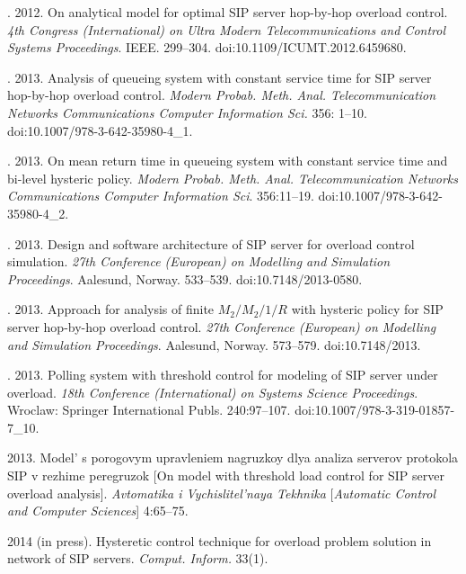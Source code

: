 \begin{multicols}{2}
{{\begin{thebibliography}{99}
. 2012.
On analytical model for optimal SIP server hop-by-hop
overload control. \textit{4th  Congress (International) on
Ultra Modern Telecommunications and Control Systems
Proceedings}. IEEE. 299--304.
doi:10.1109/ICUMT.2012.6459680.

. 2013.
Analysis of queueing system with constant service
time for SIP server hop-by-hop overload control.
\textit{Modern Probab. Meth. Anal.
Telecommunication Networks Communications
Computer Information Sci.} 356: 1--10. doi:10.1007/978-3-642-35980-4\_1.

. 2013.
On mean return time in queueing system with
constant service time and bi-level hysteric policy.
\textit{Modern Probab. Meth. Anal.
Telecommunication Networks Communications 
Computer Information Sci}. 356:11--19. doi:10.1007/978-3-642-35980-4\_2.

. 2013.
Design and software architecture of SIP server for
overload control simulation. \textit{27th  Conference (European) on
Modelling and Simulation Proceedings}. Aalesund, Norway. 533--539. doi:10.7148/2013-0580.

. 2013.
Approach for analysis of finite $M_2/M_2/1/R$ with
hysteric policy for SIP server hop-by-hop
overload control. \textit{27th  Conference (European) on
Modelling and Simulation Proceedings}. Aalesund, Norway. 573--579. doi:10.7148/2013.

. 2013.
Polling system with threshold control for
modeling of SIP server under overload.
\textit{18th  Conference (International) on
Systems Science Proceedings}. Wroclaw: Springer International Publs. 240:97--107.
doi:10.1007/978-3-319-01857-7\_10.

 2013. Model' s porogovym
upravleniem nagruzkoy dlya analiza serverov protokola SIP
v rezhime peregruzok [On model with threshold load control
for SIP server overload analysis].
\textit{Avtomatika i Vychislitel'naya Tekhnika} [\textit{Automatic
Control and Computer Sciences}] 4:65--75.

2014  (in press). 
Hysteretic control technique for overload problem
solution in network of SIP servers.
\textit{Comput. Inform.} 33(1).


\end{thebibliography}}}
\end{multicols}
